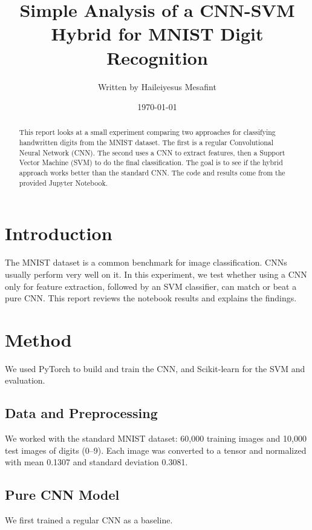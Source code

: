 \documentclass{article}
\title{Simple Analysis of a CNN-SVM Hybrid for MNIST Digit Recognition}
\author{Written by Haileiyesus Mesafint}
\date{\today}
\begin{document}
\maketitle

\begin{abstract}
This report looks at a small experiment comparing two approaches for classifying handwritten digits from the MNIST dataset. The first is a regular Convolutional Neural Network (CNN). The second uses a CNN to extract features, then a Support Vector Machine (SVM) to do the final classification. The goal is to see if the hybrid approach works better than the standard CNN. The code and results come from the provided Jupyter Notebook.
\end{abstract}

\section{Introduction}
The MNIST dataset is a common benchmark for image classification. CNNs usually perform very well on it. In this experiment, we test whether using a CNN only for feature extraction, followed by an SVM classifier, can match or beat a pure CNN. This report reviews the notebook results and explains the findings.

\section{Method}
We used PyTorch to build and train the CNN, and Scikit-learn for the SVM and evaluation.

\subsection{Data and Preprocessing}
We worked with the standard MNIST dataset: 60,000 training images and 10,000 test images of digits (0–9). Each image was converted to a tensor and normalized with mean 0.1307 and standard deviation 0.3081.

\subsection{Pure CNN Model}
We first trained a regular CNN as a baseline.
\end{document}

